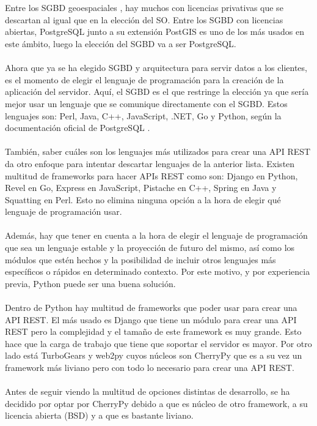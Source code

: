 \\\\
Entre los SGBD geoespaciales \cite{spartial-bd-list}, hay muchos con licencias privativas que se descartan al igual que en la elección del SO. Entre los SGBD con licencias abiertas, PostgreSQL junto a su extensión PostGIS es uno de los más usados en este ámbito, luego la elección del SGBD va a ser PostgreSQL.
\\\\
Ahora que ya se ha elegido SGBD y arquitectura para servir datos a los clientes, es el momento de elegir el lenguaje de programación para la creación de la aplicación del servidor. Aquí, el SGBD es el que restringe la elección ya que sería mejor usar un lenguaje que se comunique directamente con el SGBD. Estos lenguajes son: Perl, Java, C++, JavaScript, .NET, Go y Python, según la documentación oficial de PostgreSQL \cite{postgre-connectors}.
\\\\
También, saber cuáles son los lenguajes más utilizados para crear una API REST da otro enfoque para intentar descartar lenguajes de la anterior lista. Existen multitud de frameworks para hacer APIs REST como son: Django en Python, Revel en Go, Express en JavaScript, Pistache en C++, Spring en Java y Squatting en Perl. Esto no elimina ninguna opción a la hora de elegir qué lenguaje de programación usar.
\\\\
Además, hay que tener en cuenta a la hora de elegir el lenguaje de programación que sea un lenguaje estable y la proyección de futuro del mismo, así como los módulos que estén hechos y la posibilidad de incluir otros lenguajes más específicos o rápidos en determinado contexto. Por este motivo, y por experiencia previa, Python puede ser una buena solución.
\\\\
Dentro de Python hay multitud de frameworks \cite{python-web-frameworks} que poder usar para crear una API REST. El más usado es Django que tiene un módulo para crear una API REST pero la complejidad y el tamaño de este framework es muy grande. Esto hace que la carga de trabajo que tiene que soportar el servidor es mayor. Por otro lado está TurboGears y web2py cuyos núcleos son CherryPy que es a su vez un framework más liviano pero con todo lo necesario para crear una API REST.
\\\\
Antes de seguir viendo la multitud de opciones distintas de desarrollo, se ha decidido por optar por CherryPy debido a que es núcleo de otro framework, a su licencia abierta (BSD) y a que es bastante liviano.
